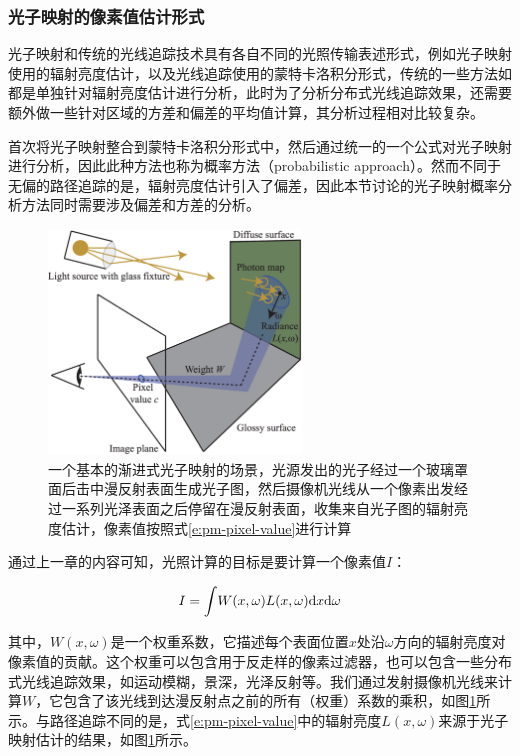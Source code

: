 \subsubsection{光子映射的像素值估计形式}
光子映射和传统的光线追踪技术具有各自不同的光照传输表述形式，例如光子映射使用的辐射亮度估计，以及光线追踪使用的蒙特卡洛积分形式，传统的一些方法如\cite{a:AProgressiveErrorEstimationFrameworkforPhotonDensityEstimation}都是单独针对辐射亮度估计进行分析，此时为了分析分布式光线追踪效果，还需要额外做一些针对区域的方差和偏差的平均值计算，其分析过程相对比较复杂。

\cite{a:ProgressivePhotonMappingAProbabilisticApproach}首次将光子映射整合到蒙特卡洛积分形式中，然后通过统一的一个公式对光子映射进行分析，因此此种方法也称为概率方法（probabilistic approach）。然而不同于无偏的路径追踪的是，辐射亮度估计引入了偏差，因此本节讨论的光子映射概率分析方法同时需要涉及偏差和方差的分析。

\begin{figure}
	\sidecaption
	\includegraphics[width=0.6\textwidth]{figures/pm/pppm}
	\caption{一个基本的渐进式光子映射的场景，光源发出的光子经过一个玻璃罩面后击中漫反射表面生成光子图，然后摄像机光线从一个像素出发经过一系列光泽表面之后停留在漫反射表面，收集来自光子图的辐射亮度估计，像素值按照式\ref{e:pm-pixel-value}进行计算}
	\label{f:pm-pppm}
\end{figure}

通过上一章的内容可知，光照计算的目标是要计算一个像素值$I$：

\begin{equation}\label{e:pm-pixel-value}
	I={\rm \int} W(x,\omega)L(x,\omega){\rm d}x{\rm d}\omega
\end{equation}

\noindent 其中，$W(x,\omega)$是一个权重系数，它描述每个表面位置$x$处沿$\omega$方向的辐射亮度对像素值的贡献。这个权重可以包含用于反走样的像素过滤器，也可以包含一些分布式光线追踪效果，如运动模糊，景深，光泽反射等。我们通过发射摄像机光线来计算$W$，它包含了该光线到达漫反射点之前的所有（权重）系数的乘积，如图\ref{f:pm-pppm}所示。与路径追踪不同的是，式\ref{e:pm-pixel-value}中的辐射亮度$L(x,\omega)$来源于光子映射估计的结果，如图\ref{f:pm-pppm}所示。

